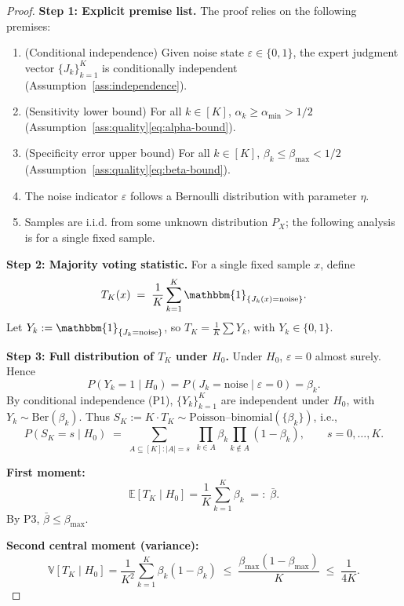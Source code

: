 \documentclass[12pt,a4paper]{article}
\newcommand{\E}{\mathbb{E}}
\newcommand{\V}{\mathbb{V}}
\newcommand{\Ber}{\mathrm{Ber}}
\begin{document}
\begin{proof}
\textbf{Step 1: Explicit premise list.}
The proof relies on the following premises:
\begin{enumerate}[label=(\textbf{P\arabic*})]
    \item (Conditional independence) Given noise state $\varepsilon\in\{0,1\}$, the expert judgment vector
          $\{J_k\}_{k=1}^{K}$ is conditionally independent (Assumption~\ref{ass:independence}).
    \item (Sensitivity lower bound) For all $k\in[K]$, $\alpha_k\geq\alpha_{\min}>1/2$
          (Assumption~\ref{ass:quality}\eqref{eq:alpha-bound}).
    \item (Specificity error upper bound) For all $k\in[K]$, $\beta_k\leq\beta_{\max}<1/2$
          (Assumption~\ref{ass:quality}\eqref{eq:beta-bound}).
    \item The noise indicator $\varepsilon$ follows a Bernoulli distribution with parameter $\eta$.
    \item Samples are i.i.d. from some unknown distribution $P_X$; the following analysis is for a single fixed sample.
\end{enumerate}

\textbf{Step 2: Majority voting statistic.}
For a single fixed sample $x$, define
\begin{equation}\label{eq:TK-def}
    T_K(x) \;=\; \frac{1}{K}\sum_{k=1}^{K} \mathbbm{1}_{\{J_k(x)=\mathrm{noise}\}}.
\end{equation}
Let $Y_k := \mathbbm{1}_{\{J_k=\mathrm{noise}\}}$, so $T_K = \frac1K\sum Y_k$, with $Y_k\in\{0,1\}$.

\textbf{Step 3: Full distribution of $T_K$ under $H_0$.}
Under $H_0$, $\varepsilon=0$ almost surely. Hence
\[
P(Y_k=1\mid H_0) = P(J_k=\mathrm{noise}\mid\varepsilon=0) = \beta_k.
\]
By conditional independence (P1), $\{Y_k\}_{k=1}^{K}$ are independent under $H_0$, with
$Y_k\sim\Ber(\beta_k)$. Thus $S_K := K\cdot T_K \sim \text{Poisson--binomial}(\{\beta_k\})$,
i.e.,
\[
P(S_K = s \mid H_0) \;=\; \sum_{A\subseteq[K]:|A|=s}\; \prod_{k\in A}\beta_k \prod_{k\notin A}(1-\beta_k),
\qquad s=0,\dots,K.
\]

\textbf{First moment:}
\[
\E[T_K\mid H_0] = \frac{1}{K}\sum_{k=1}^{K} \beta_k \;=:\; \bar{\beta}.
\]
By P3, $\bar{\beta}\leq\beta_{\max}$.

\textbf{Second central moment (variance):}
\[
\V[T_K \mid H_0] = \frac{1}{K^{2}}\sum_{k=1}^{K} \beta_k(1-\beta_k)
\;\leq\; \frac{\beta_{\max}(1-\beta_{\max})}{K}
\;\leq\; \frac{1}{4K}.
\]


\end{proof}
\end{document}
